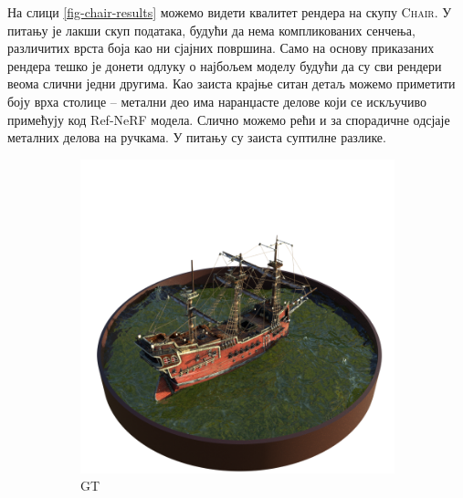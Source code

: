 \documentclass[12pt, a4paper, twoside]{book}
\numberwithin{equation}{chapter}
\numberwithin{theorem}{section}
\numberwithin{definition}{section}
\numberwithin{definitionChapter}{chapter}
\begin{document}
На слици \ref{fig-chair-results} можемо видети квалитет рендера на скупу \textsc{Chair}.
У питању је лакши скуп података, будући да нема компликованих сенчења, различитих врста
боја као ни сјајних површина. Само на основу приказаних рендера тешко је донети одлуку
о најбољем моделу будући да су сви рендери веома слични једни другима. Као заиста крајње ситан
детаљ можемо приметити боју врха столице -- метални део има наранџасте делове који се искључиво примећују
код Ref-NeRF модела. Слично можемо рећи и за спорадичне одсјаје металних делова на ручкама.
У питању су заиста суптилне разлике.

	\begin{figure}[H]
		\centering
		\begin{subfigure}{0.475\textwidth}
			\centering
			\includegraphics[scale=0.25]{img/gt/gt_ship_38.png}
			\caption{GT}
		\end{subfigure}
		\begin{subfigure}{0.475\textwidth}
			\centering

\end{subfigure}
\end{figure}
\end{document}
